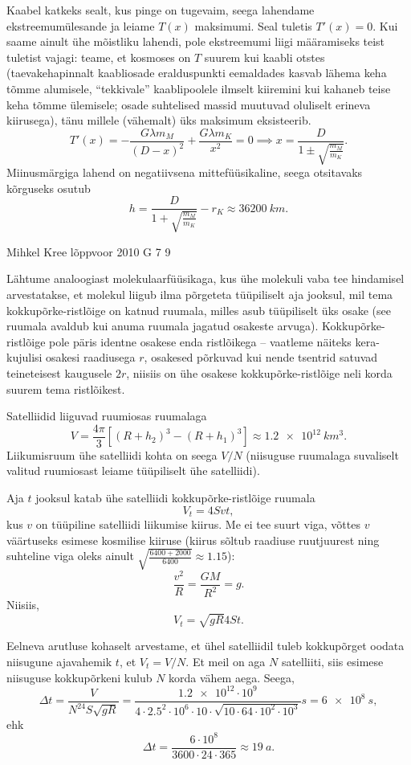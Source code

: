 \documentclass[11pt]{article}
\begin{document}
{{Kaabel katkeks sealt, kus pinge on tugevaim, seega lahendame
ekst\-ree\-mum\-üles\-an\-de
ja leiame $T(x)$ maksimumi. Seal tuletis $T'(x)=0$. Kui saame ainult ühe mõistliku lahendi, pole
ekstreemumi liigi määramiseks teist tuletist vajagi: teame, et kosmoses on $T$
suurem kui kaabli otstes (taevakehapinnalt kaabliosade eralduspunkti
eemaldades kasvab lähema keha tõmme alumisele, \enquote{tekkivale} kaablipoolele ilmselt kiiremini
kui kahaneb teise keha tõmme ülemisele; osade suhtelised massid muutuvad
oluliselt erineva kiirusega), tänu millele (vähemalt) üks maksimum eksisteerib.
\[ 
T'(x) = - \frac{ G\lambda m_M }{ (D-x)^2 } + \frac{ G\lambda m_K }{ x^2 } = 0
\implies x = \frac{D}{1 \pm \sqrt{\frac{m_M}{m_K}}}.
\]
Miinusmärgiga lahend on negatiivsena mittefüüsikaline, seega otsitavaks
kõr\-gu\-seks osutub
\[ 
h = \frac{D}{1 + \sqrt{\frac{m_M}{m_K}}} - r_K \approx
\SI{36200}{km}.
\]
\fi
}

{Mihkel Kree} %
{lõppvoor} %
{2010} %
{G 7} %
{9} %
{

\ifSolution
Lähtume analoogiast molekulaarfüüsikaga, kus ühe molekuli vaba tee hindamisel arvestatakse, et molekul liigub ilma põrgeteta tüüpiliselt aja jooksul, mil tema kokkupõrke-ristlõige on katnud ruumala, milles asub tüüpiliselt üks osake (see ruumala avaldub kui anuma ruumala jagatud osakeste arvuga). Kokkupõrke-ristlõige pole päris identne osakese enda ristlõikega -- vaatleme näiteks kera-kujulisi osakesi raadiusega $r$, osakesed põrkuvad kui nende tsentrid satuvad teineteisest kaugusele $2r$, niisiis on ühe osakese kokkupõrke-ristlõige neli korda suurem tema ristlõikest.

Satelliidid liiguvad ruumiosas ruumalaga
\[ V=\frac{4\pi}{3}\left[(R+h_2)^3-(R+h_1)^3\right]\approx \SI{1.2e12}{km^3}.\]
Liikumisruum ühe satelliidi kohta on seega $V/N$ (niisuguse ruumalaga suvaliselt valitud ruumiosast leiame tüüpiliselt ühe satelliidi).

Aja $t$ jooksul katab ühe satelliidi kokkupõrke-ristlõige ruumala
\[V_t=4Svt,\]
kus $v$ on tüüpiline satelliidi liikumise kiirus. Me ei tee suurt viga, võttes $v$ väärtuseks esimese kosmilise kiiruse (kiirus sõltub raadiuse ruutjuurest ning suhteline viga oleks ainult \mbox{$\sqrt{\frac{6400+2000}{6400}}\approx\num{1.15}$}):
\[\frac{v^2}{R}=\frac{GM}{R^2}=g.\]
Niisiis,
\[V_t=\sqrt{gR}4St.\]

Eelneva arutluse kohaselt arvestame, et ühel satelliidil tuleb kokkupõrget oodata niisugune ajavahemik $t$, et $V_t=V/N$. Et meil on aga $N$ satelliiti, siis esimese niisuguse kokkupõrkeni kulub $N$ korda vähem aega. Seega,
\[
\Delta t=\frac{V}{N^24S\sqrt{gR}}=\frac{\num{1.2e12}\cdot 10^9}{\num{4}\cdot\num{2.5}^2\cdot 10^6\cdot \num{10}\cdot \sqrt{10 \cdot \num{64} \cdot 10^2\cdot 10^3}}s=\SI{6e8}{s},
\]
ehk
\[
\Delta t=\frac{6\cdot10^{8}}{3600\cdot24\cdot365}\approx \SI{19}{a}.
\]
\fi
}

}
\end{document}
